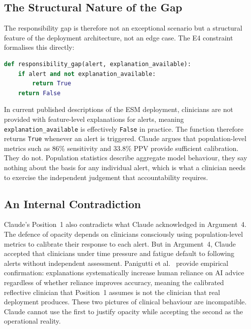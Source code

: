 \documentclass[]{UCD_CS_41820_Report}
\begin{document}
\subsection*{The Structural Nature of the Gap}

The responsibility gap is therefore not an exceptional scenario but a structural
feature of the deployment architecture, not an edge case. The E4 constraint
formalises this directly:

\begin{lstlisting}[style=mystyle, language=Python]
def responsibility_gap(alert, explanation_available):
    if alert and not explanation_available:
        return True
    return False
\end{lstlisting}

In current published descriptions of the ESM deployment, clinicians are not provided
with feature-level explanations for alerts, meaning \texttt{explanation\_available}
is effectively \texttt{False} in practice. The function therefore returns
\texttt{True} whenever an alert is triggered. Claude argues that population-level
metrics such as 86\% sensitivity and 33.8\% PPV provide sufficient calibration.
They do not. Population statistics describe aggregate model behaviour, they say
nothing about the basis for any individual alert, which is what a clinician needs
to exercise the independent judgement that accountability requires.

\subsection*{An Internal Contradiction}

Claude's Position~1 also contradicts what Claude acknowledged in Argument~4. The
defence of opacity depends on clinicians consciously using population-level metrics
to calibrate their response to each alert. But in Argument~4, Claude accepted that
clinicians under time pressure and fatigue default to following alerts without
independent assessment. Panigutti et al.\ \cite{panigutti2022} provide empirical
confirmation: explanations systematically increase human reliance on AI advice
regardless of whether reliance improves accuracy, meaning the calibrated reflective
clinician that Position~1 assumes is not the clinician that real deployment produces.
These two pictures of clinical behaviour are incompatible. Claude cannot use the
first to justify opacity while accepting the second as the operational reality.
\end{document}
